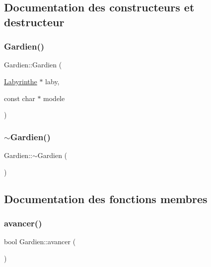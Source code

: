 \subsection{Documentation des constructeurs et destructeur}
\mbox{\label{classGardien_afc1e450fa7ad919d801475b34ced6e8d}} 
\subsubsection{\texorpdfstring{Gardien()}{Gardien()}}
{\footnotesize\ttfamily Gardien\+::\+Gardien (\begin{DoxyParamCaption}\item[{\hyperlink{classLabyrinthe}{Labyrinthe} $\ast$}]{laby,  }\item[{const char $\ast$}]{modele }\end{DoxyParamCaption})\hspace{0.3cm}{\ttfamily [inline]}}

\mbox{\label{classGardien_afef6202d924fef9d882bb40dfc4ac9fb}} 
\subsubsection{\texorpdfstring{$\sim$\+Gardien()}{~Gardien()}}
{\footnotesize\ttfamily Gardien\+::$\sim$\+Gardien (\begin{DoxyParamCaption}{ }\end{DoxyParamCaption})\hspace{0.3cm}{\ttfamily [inline]}}



\subsection{Documentation des fonctions membres}
\mbox{\label{classGardien_a1ba8ec13ead6e60ab60b9944a89212fc}} 
\subsubsection{\texorpdfstring{avancer()}{avancer()}}
{\footnotesize\ttfamily bool Gardien\+::avancer (\begin{DoxyParamCaption}{ }\end{DoxyParamCaption})\hspace{0.3cm}{\ttfamily [private]}}




